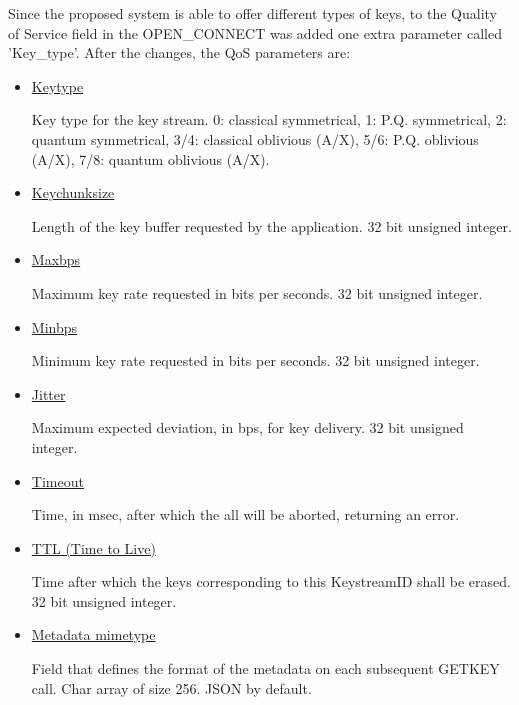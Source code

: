 \begin{refsection}
\vspace{5mm}

Since the proposed system is able to offer different types of keys, to the Quality of Service field in the OPEN\_CONNECT was added one extra parameter called 'Key\_type'. After the changes, the QoS parameters are:
		
\begin{itemize}
	\item{\underline{Key\textunderscore type}}
				
	Key type for the key stream. 0: classical symmetrical, 1: P.Q. symmetrical, 2: quantum symmetrical, 3/4: classical oblivious (A/X), 5/6: P.Q. oblivious (A/X), 7/8: quantum oblivious (A/X).
				
	\item{\underline{Key\textunderscore chunk\textunderscore size}}
				
	Length of the key buffer requested by the application. 32 bit unsigned integer.
				
	\item{\underline{Max\textunderscore bps}}
			
	Maximum key rate requested in bits per seconds. 32 bit unsigned integer.
				
	\item{\underline{Min\textunderscore bps}}
			
	Minimum key rate requested in bits per seconds. 32 bit unsigned integer.
				
	\item{\underline{Jitter}}
				
	Maximum expected deviation, in bps, for key delivery. 32 bit unsigned integer.
	
	\item{\underline{Timeout}}	
	
	Time, in msec, after which the all will be aborted, returning an error.
			
	\item{\underline{TTL (Time to Live)}}
			
	Time after which the keys corresponding to this Key\textunderscore stream\textunderscore ID shall be erased. 32 bit unsigned integer.
				
	\item{\underline{Metadata mimetype}}
			
	Field that defines the format of the metadata on each subsequent GET\textunderscore KEY call. Char array of size 256. JSON by default.
				

\end{itemize}
\end{refsection}
